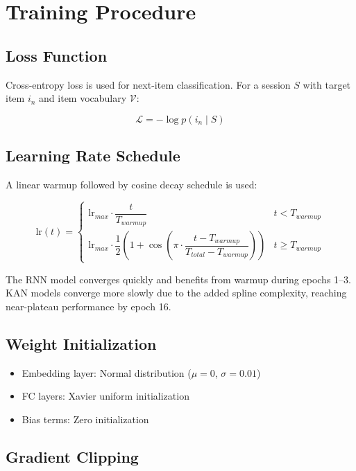 \documentclass[12pt,a4paper]{report}
\begin{document}
\section{Training Procedure}

\subsection{Loss Function}

Cross-entropy loss is used for next-item classification. For a session $S$ with
target item $i_n$ and item vocabulary $\mathcal{V}$:

\begin{equation}
\mathcal{L} = -\log p(i_n \mid S)
\end{equation}

\subsection{Learning Rate Schedule}

A linear warmup followed by cosine decay schedule is used:

\begin{equation}
\text{lr}(t) =
\begin{cases}
\text{lr}_{max} \cdot \dfrac{t}{T_{warmup}} & t < T_{warmup} \\[8pt]
\text{lr}_{max} \cdot \dfrac{1}{2}\!\left(1 + \cos\!\left(\pi \cdot
  \dfrac{t - T_{warmup}}{T_{total} - T_{warmup}}\right)\right) & t \geq T_{warmup}
\end{cases}
\end{equation}

The RNN model converges quickly and benefits from warmup during epochs 1--3.
KAN models converge more slowly due to the added spline complexity, reaching
near-plateau performance by epoch 16.

\subsection{Weight Initialization}

\begin{itemize}
    \item Embedding layer: Normal distribution ($\mu=0$, $\sigma=0.01$)
    \item FC layers: Xavier uniform initialization
    \item Bias terms: Zero initialization
\end{itemize}

\subsection{Gradient Clipping}
\end{document}
